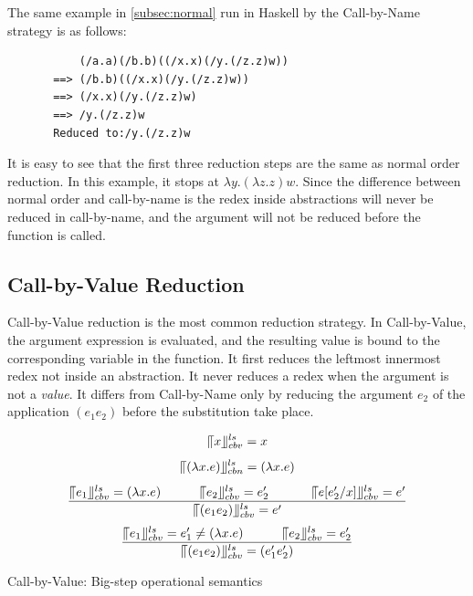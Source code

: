 \begin{exmp}
\normalfont The same example in \ref{subsec:normal} run in Haskell by the Call-by-Name strategy is as follows:
\end{exmp}


\begin{verbatim}
           (/a.a)(/b.b)((/x.x)(/y.(/z.z)w))
       ==> (/b.b)((/x.x)(/y.(/z.z)w))
       ==> (/x.x)(/y.(/z.z)w)
       ==> /y.(/z.z)w
       Reduced to:/y.(/z.z)w
\end{verbatim}

It is easy to see that the first three reduction steps are the same as normal order reduction. In this example, it stops at $\lambda y.(\lambda z.z)w$. Since the difference between normal order and call-by-name is the redex inside abstractions will never be reduced in call-by-name, and the argument will not be reduced before the function is called. 


\subsection{Call-by-Value Reduction}{\label{subsec:cbv}}

Call-by-Value reduction is the most common reduction strategy. In Call-by-Value, the argument expression is evaluated, and the resulting value is bound to the corresponding variable in the function. It first reduces the leftmost innermost redex not inside an abstraction. It never reduces a redex when the argument is not a \textit{value}. It differs from Call-by-Name only by reducing the argument $e_2$ of the application $(e_1e_2)$ before the substitution take place. 


\begin{equation*}
\llceil x \rrfloor ^{ls} _{cbv} = x
\end{equation*}
\begin{equation*}
\llceil (\lambda x.e) \rrfloor ^{ls} _{cbn} = (\lambda x.e)
\end{equation*}
\begin{equation*}
\frac{\llceil e_1 \rrfloor ^{ls} _{cbv} = (\lambda x.e)\ \ \ \ \ \ \ \ \ \llceil e_2 \rrfloor ^{ls} _{cbv} = e'_2\ \ \ \ \ \ \ \ \ \ \llceil e[e'_2/x] \rrfloor ^{ls} _{cbv}  = e'}{\llceil (e_1e_2) \rrfloor ^{ls} _{cbv} = e'}
\end{equation*}
\begin{equation*}
\frac{\llceil e_1 \rrfloor ^{ls} _{cbv} = e'_1\neq (\lambda x.e)\ \ \ \ \ \ \ \ \ \llceil e_2 \rrfloor ^{ls} _{cbv} = e'_2}{\llceil (e_1e_2) \rrfloor ^{ls} _{cbv} = (e'_1e'_2)}
\end{equation*}
\begin{center}
Call-by-Value: Big-step operational semantics
\end{center}

